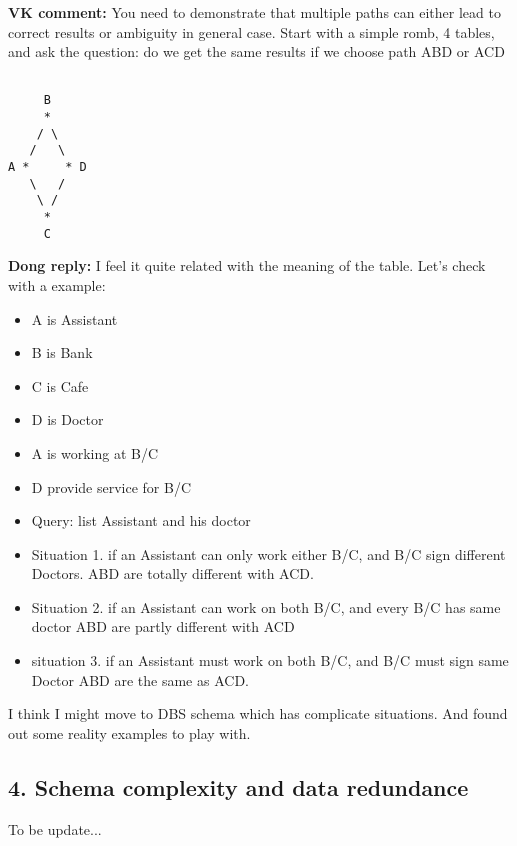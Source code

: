 {\bf VK comment:} You need to demonstrate that multiple paths can either lead to correct results
or ambiguity in general case. Start with a simple romb, 4 tables, and ask the question:
do we get the same results if we choose path ABD or ACD

\begin{verbatim}

     B
     *
    / \
   /   \
A *     * D
   \   /
    \ /
     *
     C

\end{verbatim}

\setlength{\parindent}{0.5in}
{\bf Dong reply:}
I feel it quite related with the meaning of the table. Let's check with a example:
\begin{itemize}
\item A is Assistant
\item B is Bank
\item C is Cafe
\item D is Doctor
\item A is working at B/C
\item D provide service for B/C
\item Query: list Assistant and his doctor
\item Situation 1. if an Assistant can only work either B/C, and B/C sign different Doctors. 
ABD are totally different with ACD.
\item Situation 2. if an Assistant can work on both B/C, and every B/C has same doctor
ABD are partly different with ACD
\item situation 3. if an Assistant must work on both B/C, and B/C must sign same Doctor
ABD are the same as ACD.
\end{itemize}
I think I might move to DBS schema which has complicate situations. And found out some reality examples to play with.
\setlength{\parindent}{0.25in}


\begin{center}
{\section*{{\normalsize\bf 4. Schema complexity and data redundance}}}
To be update...
\end{center}

